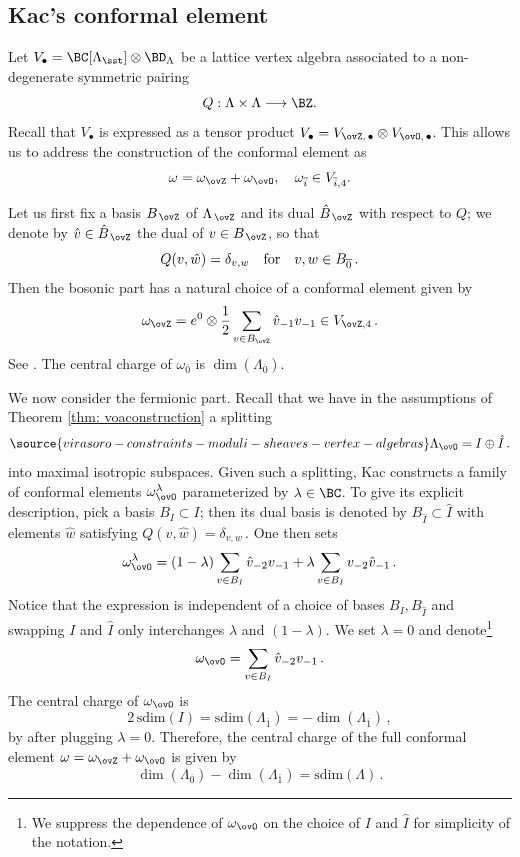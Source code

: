 \subsection{Kac's conformal element}
\label{sec: Kacconformal}

Let $V_\bullet = \BC[\Lambda_\sst]\otimes \BD_\Lambda$ be a lattice vertex algebra associated to a non-degenerate symmetric pairing
$$
Q:\Lambda\times \Lambda\longrightarrow \BZ.
$$
Recall that $V_\bullet$ is expressed as a tensor product  $V_\bullet = V_{\ovZ,\,\bullet}\otimes V_{\ovO,\,\bullet}$. This allows us to address the construction of the conformal element as
$$\omega=\omega_{\ovZ}+\omega_{\ovO},\quad \omega_{\overline{i}}\in V_{\overline{i},4}.
$$

Let us first fix a basis $B_{\,\ovZ}$ of $\Lambda_{\,\ovZ}$ and its dual $\hat{B}_{\,\ovZ}$ with respect to $Q$; we denote by $\hat{v}\in \hat{B}_{\,\ovZ}$ the dual of $v\in B_{\,\ovZ}$, so that
\[Q(v, \hat w)=\delta_{v,w}\quad\textup{for}\quad v, w\in B_{\overline 0}\,.\]Then the bosonic part has a natural choice of a conformal element given by
$$
\omega_{\ovZ} = e^0\otimes \frac{1}{2}\sum_{v\in B_{\ovZ}}\hat{v}_{-1} v_{-1} \in V_{\ovZ,4}\,.
$$
See \cite[Proposition 5.5]{Ka98}. The central charge of $\omega_{\overline 0}$ is $\dim(\Lambda_{\overline 0})$.

We now consider the fermionic part. Recall that we have in the assumptions of Theorem \ref{thm: voaconstruction} a splitting
\begin{equation}
\label{Eq: splittingisotropic}
\source{virasoro-constraints-moduli-sheaves-vertex-algebras}
\Lambda_{\ovO} = I\oplus \hat{I}\,.
\end{equation}
into maximal isotropic subspaces. Given such a splitting, Kac \cite[3.6.14]{Ka98} constructs a family of conformal elements $\omega^\lambda_{\ovO}$ parameterized by $\lambda\in \BC$. To give its explicit description, pick a basis $B_I\subset I$; then its dual basis is denoted by $B_{\hat{I}}\subset \hat{I}$ with elements $\hat{w}$ satisfying
$Q(v,\hat{w}) = \delta_{v,w}\,.$ One then sets
$$
\omega^\lambda_{\ovO} = (1-\lambda)\sum_{v\in B_I}\hat{v}_{-2}v_{-1} + \lambda \sum_{v\in B_I}v_{-2}\hat{v}_{-1}\,.
$$
Notice that the expression is independent of a choice of bases $B_I,B_{\hat{I}}$ and swapping $I$ and $\hat{I}$ only interchanges $\lambda$ and $(1-\lambda)$. We set $\lambda=0$ and denote\footnote{We suppress the dependence of $\omega_{\ovO}$ on the choice of $I$ and $\hat{I}$ for simplicity of the notation.}
$$
\omega_{\ovO} = \sum_{v\in B_I}\hat{v}_{-2}v_{-1}\,.
$$
The central charge of $\omega_{\ovO}$ is
\[2\,\mathrm{sdim}(I)=\mathrm{sdim}(\Lambda_{\overline 1})=-\dim(\Lambda_{\overline 1})\,,\]
by \cite[3.6.16]{Ka98} after plugging $\lambda=0$. Therefore,  the central charge of the full conformal element $\omega=\omega_{\ovZ}+\omega_{\ovO}$ is given by
$$\dim(\Lambda_{\overline{0}})-\dim(\Lambda_{\overline{1}})=\mathrm{sdim}(\Lambda)\,.
$$

